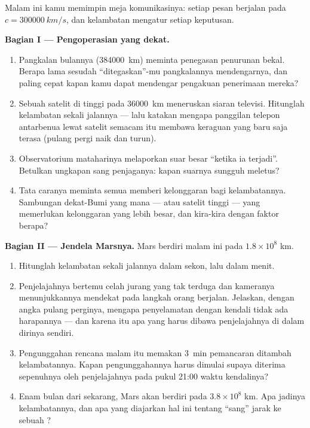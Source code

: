 \begin{problem}\label{pb:g8:speed-of-light:1}
Malam ini kamu memimpin meja komunikasinya: setiap pesan berjalan pada
$c = \qty{300000}{km/s}$, dan kelambatan  mengatur setiap
keputusan.

\medskip\noindent\textbf{Bagian I --- Pengoperasian yang dekat.}
\begin{enumerate}
  \item Pangkalan bulannya (\qty{384000}{km}) meminta penegasan
        penurunan bekal. Berapa lama sesudah ``ditegaskan''-mu
        pangkalannya mendengarnya, dan paling cepat kapan kamu dapat
        mendengar pengakuan penerimaan mereka?
  \item Sebuah satelit di  tinggi pada \qty{36000}{km}
        meneruskan siaran televisi. Hitunglah kelambatan sekali
        jalannya --- lalu katakan mengapa panggilan telepon
        antarbenua lewat satelit semacam itu membawa keraguan yang
        baru saja terasa (pulang pergi naik dan turun).
  \item Observatorium mataharinya melaporkan suar besar ``ketika ia
        terjadi''. Betulkan ungkapan sang penjaganya: kapan suarnya
        sungguh meletus?
  \item Tata caranya meminta semua  memberi kelonggaran bagi
        kelambatannya. Sambungan dekat-Bumi yang mana ---  atau
        satelit tinggi --- yang memerlukan kelonggaran yang lebih
        besar, dan kira-kira dengan faktor berapa?
\end{enumerate}

\medskip\noindent\textbf{Bagian II --- Jendela Marsnya.}
Mars berdiri malam ini pada $1.8 \times 10^{8}$ km.
\begin{enumerate}[resume]
  \item Hitunglah kelambatan sekali jalannya dalam sekon, lalu dalam
        menit.
  \item Penjelajahnya bertemu celah jurang yang tak terduga dan
        kameranya menunjukkannya mendekat pada langkah orang berjalan.
        Jelaskan, dengan angka pulang perginya, mengapa penyelamatan
        dengan  kendali tidak ada harapannya --- dan karena itu
        apa yang harus dibawa penjelajahnya di dalam dirinya sendiri.
  \item Pengunggahan rencana malam itu memakan \qty{3}{min}
        pemancaran ditambah kelambatannya. Kapan pengunggahannya harus
        dimulai supaya diterima sepenuhnya oleh penjelajahnya pada
        pukul 21:00 waktu kendalinya?
  \item Enam bulan dari sekarang, Mars akan berdiri pada $3.8 \times
        10^{8}$ km. Apa jadinya kelambatannya, dan apa yang diajarkan
        hal ini tentang ``sang'' jarak ke sebuah ?
\end{enumerate}


\end{problem}
